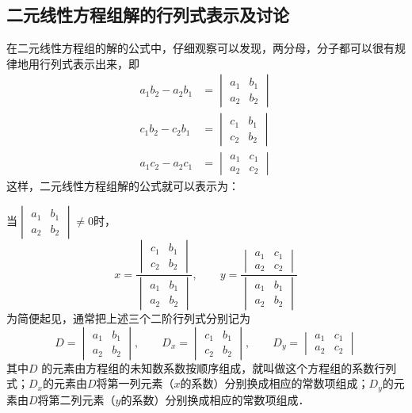 \subsection{二元线性方程组解的行列式表示及讨论}

在二元线性方程组的解的公式中，仔细观察可以发现，两分母，分子都可以很有规律地用行列式表示出来，即
\[\begin{split}
    a_1b_2-a_2b_1&=\begin{vmatrix}
        a_1&b_1\\a_2&b_2
    \end{vmatrix}\\
    c_1b_2-c_2b_1&=\begin{vmatrix}
        c_1&b_1\\c_2&b_2
    \end{vmatrix}\\
    a_1c_2-a_2c_1&=\begin{vmatrix}
        a_1&c_1\\a_2&c_2
    \end{vmatrix} 
\end{split}\]
这样，二元线性方程组解的公式就可以表示为：

当$\begin{vmatrix}
    a_1&b_1\\a_2&b_2
\end{vmatrix}\ne 0$时，
\[x=\frac{\begin{vmatrix}
    c_1&b_1\\c_2&b_2
\end{vmatrix}}{\begin{vmatrix}
    a_1&b_1\\a_2&b_2
\end{vmatrix}},\qquad y=\frac{\begin{vmatrix}
    a_1&c_1\\a_2&c_2
\end{vmatrix}}{\begin{vmatrix}
    a_1&b_1\\a_2&b_2
\end{vmatrix}}\]
为简便起见，通常把上述三个二阶行列式分别记为
\[D=\begin{vmatrix}
    a_1&b_1\\a_2&b_2
\end{vmatrix},\qquad D_x=\begin{vmatrix}
    c_1&b_1\\c_2&b_2
\end{vmatrix},\qquad D_y=\begin{vmatrix}
    a_1&c_1\\a_2&c_2
\end{vmatrix}\]
其中$D$ 的元素由方程组的未知数系数按顺序组成，就叫做这个方程组的系数行列式；$D_x$的元素由$D$将第一列元素（$x$的系数）分别换成相应的常数项组成；$D_y$的元素由$D$将第二列元素（$y$的系数）分别换成相应的常数项组成．

